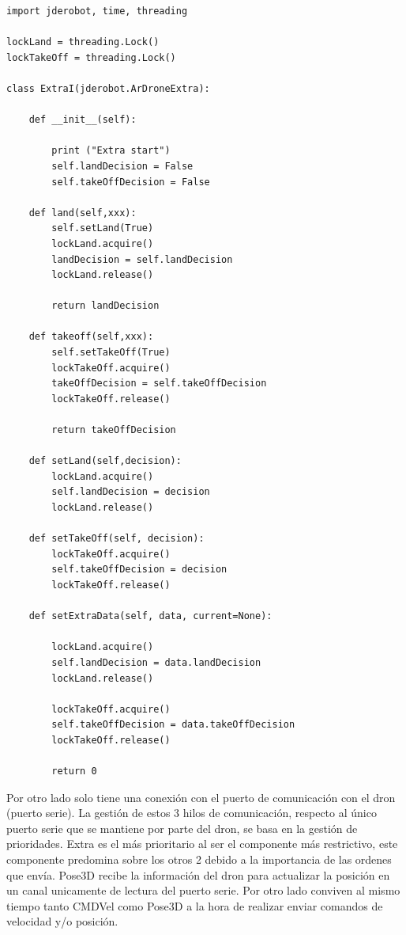 \begin{lstlisting}[frame=single]
import jderobot, time, threading

lockLand = threading.Lock()
lockTakeOff = threading.Lock()

class ExtraI(jderobot.ArDroneExtra):

    def __init__(self):

        print ("Extra start")
        self.landDecision = False
        self.takeOffDecision = False

    def land(self,xxx):
        self.setLand(True)
        lockLand.acquire()
        landDecision = self.landDecision
        lockLand.release()

        return landDecision

    def takeoff(self,xxx):
        self.setTakeOff(True)
        lockTakeOff.acquire()
        takeOffDecision = self.takeOffDecision
        lockTakeOff.release()

        return takeOffDecision

    def setLand(self,decision):
        lockLand.acquire()
        self.landDecision = decision
        lockLand.release()

    def setTakeOff(self, decision):
        lockTakeOff.acquire()
        self.takeOffDecision = decision
        lockTakeOff.release()

    def setExtraData(self, data, current=None):

        lockLand.acquire()
        self.landDecision = data.landDecision
        lockLand.release()

        lockTakeOff.acquire()
        self.takeOffDecision = data.takeOffDecision
        lockTakeOff.release()

        return 0

\end{lstlisting}  
Por otro lado solo tiene una conexión con el puerto de comunicación con el dron (puerto serie). La gestión de estos 3 hilos de comunicación, respecto al único puerto serie que se mantiene por parte del dron, se basa en la gestión de prioridades. Extra es el más prioritario al ser el componente más restrictivo, este componente predomina sobre los otros 2 debido a la importancia de las ordenes que envía. Pose3D recibe la información del dron para actualizar la posición en un canal unicamente de lectura del puerto serie. Por otro lado conviven al mismo tiempo tanto CMDVel como Pose3D a la hora de realizar enviar comandos de velocidad y/o posición.

